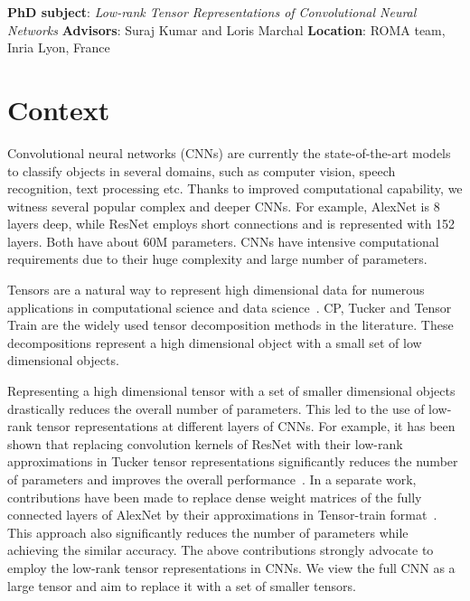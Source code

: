 \documentclass[a4paper]{article}
\date{}
\begin{document}
\noindent\textbf{PhD subject}: \emph{Low-rank Tensor Representations of Convolutional Neural Networks }\newline
\textbf{Advisors}: Suraj Kumar and Loris Marchal\newline
\textbf{Location}: ROMA team, Inria Lyon, France
\section*{Context}
Convolutional neural networks (CNNs) are currently the state-of-the-art models to classify objects in several domains, such as computer vision, speech recognition, text processing etc. Thanks to improved computational capability, we witness several popular complex and deeper CNNs. For example, AlexNet is 8 layers deep, while ResNet employs short connections and is represented with 152 layers. Both have about 60M parameters. CNNs have intensive computational requirements due to their huge complexity and large number of parameters. 



Tensors are a natural way to represent high dimensional data for numerous applications in computational science and data science~\cite{KB-SIAMReview2009}. CP, Tucker and Tensor Train are the widely used tensor decomposition methods in the literature. These decompositions represent a high dimensional object with a small set of low dimensional objects.



Representing a high dimensional tensor with a set of smaller dimensional objects drastically reduces the overall number of parameters. This led to the use of low-rank tensor representations at different layers of CNNs. For example, it has been shown that replacing convolution kernels of ResNet with their low-rank approximations in Tucker tensor representations significantly reduces the number of parameters and improves the overall performance~\cite{PSSEG+-ECCV2020}. In a separate work, contributions have been made to replace dense weight matrices of the fully connected layers of AlexNet by their approximations in Tensor-train format~\cite{NPOV-NIPS2015}. This approach also significantly reduces the number of parameters while achieving the similar accuracy. The above contributions strongly advocate to employ the low-rank tensor representations in CNNs. We view the full CNN as a large tensor and aim to replace it with a set of smaller tensors.
\end{document}
